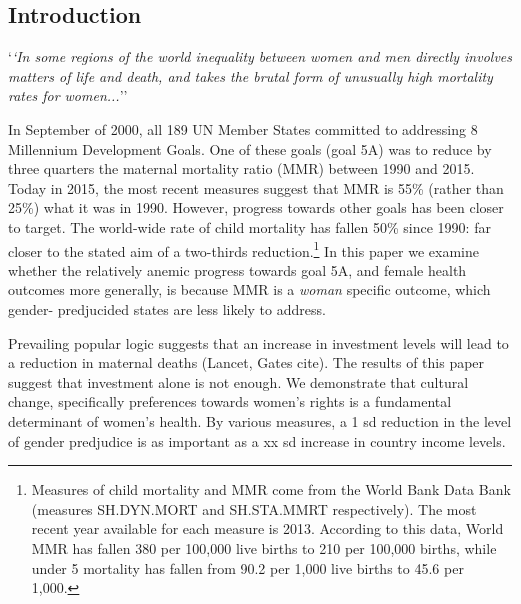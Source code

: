 \documentclass[11pt]{article}
\begin{document}
\thispagestyle{empty}
\setlength{\baselineskip}{1.4\baselineskip} 
\newpage 
\begin{spacing}{1.4}

\section{Introduction}
\epigraph{`\textit{`In some regions of the world inequality between women and 
men directly involves matters of life and death, and takes the brutal form of 
unusually high mortality rates for women...}'' }{\citet{sen2001many}}

In September of 2000, all 189 UN Member States committed to addressing 8 
Millennium Development Goals.  One of these goals (goal 5A) was to reduce by 
three quarters the maternal mortality ratio (MMR) between 1990 and 2015.  Today 
in 2015, the most recent measures suggest that MMR is 55\% (rather than 25\%) 
what it was in 1990. However, progress towards other goals has been closer to 
target. The world-wide rate of child mortality has fallen 50\% since 1990: far 
closer to the stated aim of a two-thirds reduction.\footnote{Measures of child 
mortality and MMR come from the World Bank Data Bank (measures SH.DYN.MORT and 
SH.STA.MMRT respectively).  The most recent year available for each measure is 
2013.  According to this data, World MMR has fallen 380 per 100,000 live births 
to 210 per 100,000 births, while under 5 mortality has fallen from 90.2 per 
1,000 live births to 45.6 per 1,000.}  In this paper we examine whether the 
relatively anemic progress towards goal 5A, and female health outcomes more 
generally, is because MMR is a \emph{woman} specific outcome, which gender-%
predjucided states are less likely to address.

Prevailing popular logic suggests that an increase in investment levels will 
lead to a reduction in maternal deaths (Lancet, Gates cite).  The results of 
this paper suggest that investment alone is not enough.  We demonstrate that 
cultural change, specifically preferences towards women's rights is a 
fundamental determinant of women's health.  By various measures, a 1 sd 
reduction in the level of gender predjudice is as important as a xx sd increase 
in country income levels.




\end{spacing}
\end{document}
